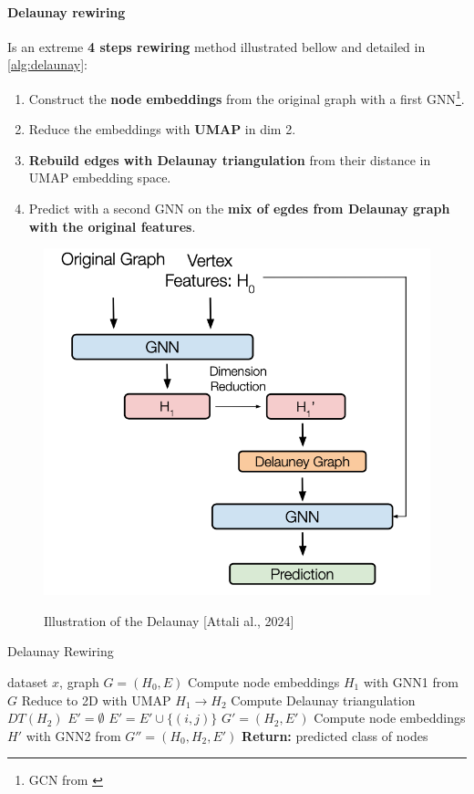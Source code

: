 \documentclass{article}
\theoremstyle{plain}
\theoremstyle{definition}
\theoremstyle{remark}
\begin{document}
\paragraph{Delaunay rewiring}
Is an extreme \textbf{4 steps rewiring} method illustrated bellow and detailed 
in \cref{alg:delaunay}:
\begin{enumerate}
    \item Construct the \textbf{node embeddings} from the original graph with 
        a first GNN\footnote{GCN from \cite{kipf2017semi}}.
    \item Reduce the embeddings with \textbf{UMAP} in dim 2.
    \item \textbf{Rebuild edges with Delaunay triangulation} from their distance in UMAP embedding space.
    \item Predict with a second GNN on the \textbf{mix of egdes from Delaunay graph with the original features}.
\end{enumerate}
\begin{figure}[ht!]
    \begin{center}
    \vskip -0.2in
    \includegraphics[width=0.8\columnwidth]{figures/Rewiring_method_s.png}
    \caption{Illustration of the Delaunay [Attali al., 2024] \cite{attali2024delaunay}}
    \vskip -0.2in
    \label{fig:delaunay_rewiring}
    
    \end{center}
\end{figure}

\begin{algorithm}[htb!]
    \caption{Delaunay Rewiring}
    \label{alg:delaunay}
 \begin{algorithmic}
     dataset $x$, graph $G = (H_0, E)$
    \STATE Compute node embeddings $H_1$ with GNN1 from $G$ 
    \STATE Reduce  to 2D with UMAP $H_1 \to H_2$
    \STATE Compute Delaunay triangulation $DT(H_2)$
    \STATE $E' = \emptyset$
        \STATE $E' = E' \cup \{(i, j)\}$  
    \ENDFOR
    \STATE  $G' = (H_2, E')$  
    \STATE Compute node embeddings $H'$ with GNN2 from $G'' = (H_0, H_2, E')$
    {\bfseries Return:}  predicted class of nodes
 \end{algorithmic}
 \end{algorithm}
\end{document}
